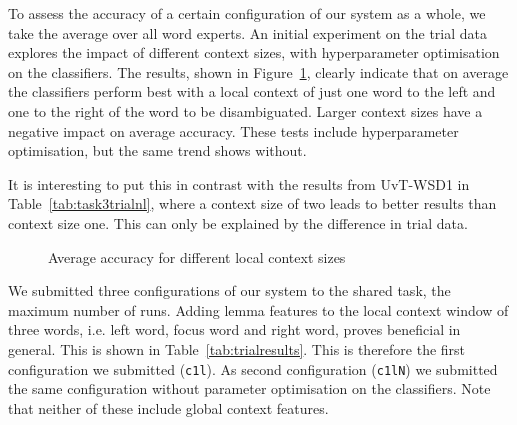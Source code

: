 To assess the accuracy of a certain configuration of our system as a whole, we
take the average over all word experts. An initial experiment on the trial data
explores the impact of different context sizes, with hyperparameter
optimisation on the classifiers. The results, shown in Figure~\ref{figcontext},
clearly indicate that on average the classifiers perform best with a local
context of just one word to the left and one to the right of the word to be
disambiguated. Larger context sizes have a negative impact on average accuracy.
These tests include hyperparameter optimisation, but the same trend shows
without.

It is interesting to put this in contrast with the results from UvT-WSD1 in
Table~\ref{tab:task3trialnl}, where a context size of two leads to better
results than context size one.  This can only be explained by the
difference in trial data. %

\begin{figure}[t]
\noindent{}
\caption{Average accuracy for different local context sizes}
\label{figcontext}
\end{figure}

We submitted three configurations of our system to the shared task, the maximum
number of runs. Adding lemma features to the local context window of three
words, i.e. left word, focus word and right word, proves beneficial in general.
This is shown in Table~\ref{tab:trialresults}.  This is therefore the first
configuration we submitted (\texttt{c1l}). As second configuration
(\texttt{c1lN}) we submitted the same configuration without parameter
optimisation on the classifiers. Note that neither of these include global
context features.

